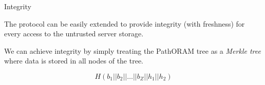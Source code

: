 	\begin{frame}{Integrity}
		
		The protocol can be easily extended to provide integrity (with freshness) for every access to the untrusted server storage.

		We can achieve integrity by simply treating the PathORAM tree as a \emph{Merkle tree} where data is stored in all nodes of the tree.

		\[
			H (b_1 || b_2 || \ldots || b_Z || h_1 || h_2 )
		\]

	\end{frame}
